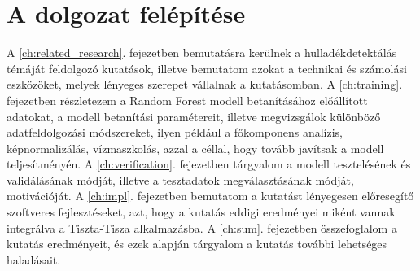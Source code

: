 \section{A dolgozat felépítése}
A \ref{ch:related_research}. fejezetben bemutatásra kerülnek a hulladékdetektálás témáját feldolgozó kutatások, illetve bemutatom azokat a technikai és számolási eszközöket, melyek lényeges szerepet vállalnak a kutatásomban.
A \ref{ch:training}. fejezetben részletezem a Random Forest modell betanításához előállított adatokat, a modell betanítási paramétereit, illetve megvizsgálok különböző adatfeldolgozási módszereket, ilyen például a főkomponens analízis, képnormalizálás, vízmaszkolás, azzal a céllal, hogy tovább javítsak a modell teljesítményén. A \ref{ch:verification}. fejezetben tárgyalom a modell tesztelésének és validálásának módját, illetve a tesztadatok megválasztásának módját, motivációját. A \ref{ch:impl}. fejezetben bemutatom a kutatást lényegesen előresegítő szoftveres fejlesztéseket, azt, hogy a kutatás eddigi eredményei miként vannak integrálva a Tiszta-Tisza alkalmazásba. A \ref{ch:sum}. fejezetben összefoglalom a kutatás eredményeit, és ezek alapján tárgyalom a kutatás további lehetséges haladásait. 